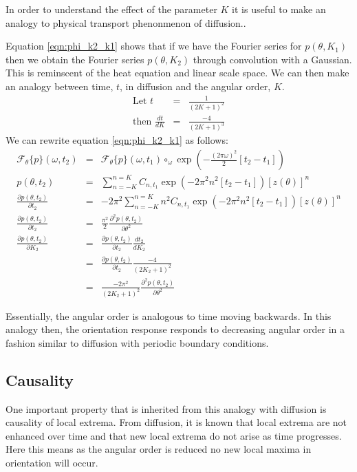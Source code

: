 \documentclass{article}
\begin{document}
In order to understand the effect of the parameter $ K $ it is useful to make an analogy to physical transport phenonmenon of diffusion..

Equation \ref{eqn:phi_k2_k1} shows that if we have the Fourier series for $ p(\theta,K_1) $ then we obtain the Fourier series $ p(\theta,K_2) $ through convolution with a Gaussian. This is reminscent of the heat equation and linear scale space. We can then make an analogy between time, $ t $, in diffusion and the angular order, $ K $.
\begin{eqnarray} 
	\mbox{Let } t & = & \frac{1}{(2K+1)^2} \\
	\mbox{then } \frac{dt}{dK} & = & \frac{-4}{(2K+1)^3} 
\end{eqnarray}
We can rewrite equation \ref{eqn:phi_k2_k1} as follows:
\begin{eqnarray}
	\mathcal{F}_\theta \{ p \} (\omega,t_2) & = & \mathcal{F}_\theta \{ p \} (\omega,t_1)  \circ_\omega \exp\left(- \frac{(2\pi\omega)^2}{2}  \left[ t_2 - t_1 \right] \right) \\
	p(\theta,t_2) & = & \sum_{n=-K}^{n=K} C_{n,t_1} \exp(-2\pi^2 n^2 \left[t_2-t_1\right]) \left[ z(\theta) \right]^n  \\
	\frac{\partial p(\theta,t_2)}{\partial t_2} & = & -2 \pi^2 \sum_{n=-K}^{n=K} n^2 C_{n,t_1} \exp(-2\pi^2 n^2 \left[t_2-t_1\right]) \left[ z(\theta) \right]^n  \\
	\frac{\partial p(\theta,t_2)}{\partial t_2} & = & \frac{\pi^2}{2} \frac{\partial^2 p(\theta, t_2)}{\partial \theta^2} \label{eqn:heateqn} \\
	\frac{\partial p(\theta,t_2)}{\partial K_2} & = & \frac{\partial p(\theta,t_2)}{\partial t_2} \frac{dt_2}{dK_2}  \\
	& = &  \frac{\partial p(\theta,t_2)}{\partial t_2} \frac{-4}{(2K_2+1)^2} \\
	& = &  \frac{-2 \pi^2 }{(2K_2+1)^2} \frac{\partial^2 p(\theta, t_2)}{\partial \theta^2} 
\end{eqnarray}

Essentially, the angular order is analogous to time moving backwards. In this analogy then, the orientation response responds to decreasing angular order in a fashion similar to diffusion with periodic boundary conditions.

\subsection{Causality}
One important property that is inherited from this analogy with diffusion is causality of local extrema. From diffusion, it is known that local extrema are not enhanced over time and that new local extrema do not arise as time progresses. Here this means as the angular order is reduced no new local maxima in orientation will occur.
\end{document}
